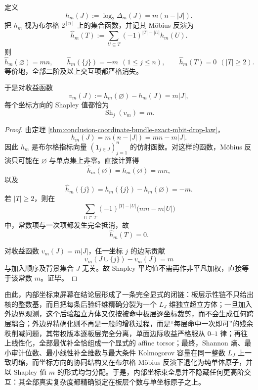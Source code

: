 \begin{theorem}\label{thm:conclusion-coordinate-bundle-mobius-atomicity-shapley-law}
定义
\[
h_m(J):=\log_2\Delta_m(J)=m(n-|J|).
\]
把 \(h_m\) 视为布尔格 \(2^{[n]}\) 上的集合函数，并记其 Möbius 反演为
\[
\widehat h_m(T):=
\sum_{U\subseteq T}(-1)^{|T|-|U|}h_m(U).
\]
则
\[
\widehat h_m(\varnothing)=mn,
\qquad
\widehat h_m(\{j\})=-m\ \ (1\le j\le n),
\qquad
\widehat h_m(T)=0\ \ (|T|\ge 2).
\]
等价地，全部二阶及以上交互项都严格消失。

于是对收益函数
\[
v_m(J):=h_m(\varnothing)-h_m(J)=m|J|,
\]
每个坐标方向的 Shapley 值都恰为
\[
\operatorname{Sh}_j(v_m)=m.
\]
\end{theorem}
\begin{proof}
由定理 \ref{thm:conclusion-coordinate-bundle-exact-mbit-drop-law}，
\[
h_m(J)=m(n-|J|)=mn-m|J|.
\]
因此 \(h_m\) 是布尔格指标向量 \((\mathbf 1_{j\in J})_{j=1}^{n}\) 的仿射函数。对这样的函数，Möbius 反演只可能在 \(\varnothing\) 与单点集上非零。直接计算得
\[
\widehat h_m(\varnothing)=h_m(\varnothing)=mn,
\]
以及
\[
\widehat h_m(\{j\})=h_m(\{j\})-h_m(\varnothing)=-m.
\]
若 \(|T|\ge 2\)，则在
\[
\sum_{U\subseteq T}(-1)^{|T|-|U|}\bigl(mn-m|U|\bigr)
\]
中，常数项与一次项都发生完全抵消，故
\[
\widehat h_m(T)=0.
\]

对收益函数 \(v_m(J)=m|J|\)，任一坐标 \(j\) 的边际贡献
\[
v_m(J\cup\{j\})-v_m(J)=m
\]
与加入顺序及背景集合 \(J\) 无关。故 Shapley 平均值不需再作非平凡加权，直接等于该常数 \(m\)。证毕。
\end{proof}

\noindent
由此，内部坐标束屏幕在结论层形成了一条完全显式的闭链：板层示性链不只给出核的整数基，而且把每条后验纤维精确分裂为一个 \(L_J\) 维独立超立方体；一旦加入外边界观测，这个后验超立方体又仅按被命中板层逐坐标裁剪，而不会生成任何跨层耦合；外边界精确化则不再是一般的增秩过程，而是“每层命中一次即可”的残余秩削减问题，其带权版本逐板层完全分离，单面边际收益严格服从 \(0\text{--}1\) 律；再往上线性化，全部最优补全恰组成一个显式的 affine torsor；最终，Shannon 熵、最小审计位数、最小线性补全维数与最大条件 Kolmogorov 容量在同一整数 \(L_J\) 上一致坍缩，而坐标方向的协同结构又在布尔格 Möbius 反演下退化为纯单体原子，并以 Shapley 值 \(m\) 的形式均匀分配。于是，内部坐标束全息并不隐藏任何更高阶交互：其全部真实复杂度都精确锁定在板层个数与单坐标原子之上。

\endinput
